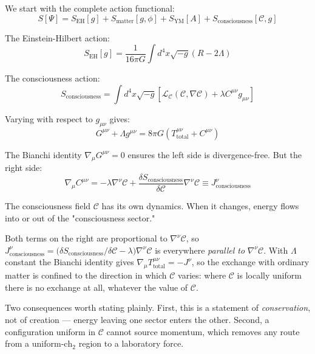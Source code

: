 \begin{level2}
We start with the complete action functional:
\begin{equation}
S[\Psi] = S_{\text{EH}}[g] + S_{\text{matter}}[g,\phi] + S_{\text{YM}}[A] + S_{\text{consciousness}}[\mathcal{C},g]
\end{equation}

The Einstein-Hilbert action\cite{misner1973,wald1984,carroll2004}:
\begin{equation}
S_{\text{EH}}[g] = \frac{1}{16\pi G} \int d^4x \sqrt{-g} (R - 2\Lambda)
\end{equation}

The consciousness action:
\begin{equation}
S_{\text{consciousness}} = \int d^4x \sqrt{-g} \left[ \mathcal{L}_\mathcal{C}(\mathcal{C}, \nabla\mathcal{C}) + \lambda C^{\mu\nu} g_{\mu\nu} \right]
\end{equation}

Varying with respect to $g_{\mu\nu}$ gives:
\begin{equation}
G^{\mu\nu} + \Lambda g^{\mu\nu} = 8\pi G \left( T^{\mu\nu}_{\text{total}} + C^{\mu\nu} \right)
\end{equation}

The Bianchi identity $\nabla_\mu G^{\mu\nu} = 0$ ensures the left side is divergence-free. But the right side:
\begin{equation}
\nabla_\mu C^{\mu\nu} = -\lambda \nabla^\nu \mathcal{C} + \frac{\delta S_{\text{consciousness}}}{\delta \mathcal{C}} \nabla^\nu \mathcal{C} \equiv J^\nu_{\text{consciousness}}
\end{equation}

The consciousness field $\mathcal{C}$ has its own dynamics. When it changes, energy flows into or out of the "consciousness sector."

\begin{remark}
\label{rem:Jnu-gradient-2026-10-03}
Both terms on the right are proportional to $\nabla^\nu \mathcal{C}$, so
$J^\nu_{\text{consciousness}} = \bigl(\delta S_{\text{consciousness}}/\delta\mathcal{C} - \lambda\bigr)\nabla^\nu\mathcal{C}$
is everywhere \emph{parallel to} $\nabla^\nu\mathcal{C}$. With $\Lambda$ constant
the Bianchi identity gives $\nabla_\mu T^{\mu\nu}_{\text{total}} = -J^\nu$, so the
exchange with ordinary matter is confined to the direction in which $\mathcal{C}$
varies: where $\mathcal{C}$ is locally uniform there is no exchange at all,
whatever the value of $\mathcal{C}$.

Two consequences worth stating plainly. First, this is a statement of
\emph{conservation}, not of creation --- energy leaving one sector enters the
other. Second, a configuration uniform in $\mathcal{C}$ cannot source momentum,
which removes any route from a uniform-$\text{ch}_2$ region to a laboratory
force.
\end{remark}
\end{level2}

